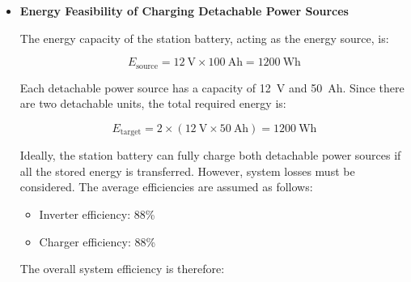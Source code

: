 {\begin{itemize}
 \begin{equation}
 	E_{\text{battery}} = V \times Ah = 12~\text{V} \times 100~\text{Ah} = 1200~\text{Wh}
 \end{equation}
 
 The system uses a 410~W solar panel as the charging source. The theoretical charging time, assuming ideal conditions and no system losses, is given by:
 
 \begin{equation}
 	t_{\text{charge}} = \frac{E_{\text{battery}}}{P_{\text{solar}}}
 	= \frac{1200~\text{Wh}}{410~\text{W}}
 	\approx 2.93~\text{hours}
 \end{equation}
 
 This value represents the ideal charging time. In real-world operation, charging will take longer due to inefficiencies in the system and variations in solar irradiance. Considering the average peak sun hours in the Philippines, which ranges from 4.5 to 5.5 hours per day, a practical charging duration of approximately 3-4 hours under peak sunlight is reasonable.
 
 	\item\textbf{Energy Feasibility of Charging Detachable Power Sources} 
 
 The energy capacity of the station battery, acting as the energy source, is:
 
 \begin{equation}
 	E_{\text{source}} = 12~\text{V} \times 100~\text{Ah} = 1200~\text{Wh}
 \end{equation}
 
 Each detachable power source has a capacity of 12~V and 50~Ah. Since there are two detachable units, the total required energy is:
 
 \begin{equation}
 	E_{\text{target}} = 2 \times (12~\text{V} \times 50~\text{Ah}) = 1200~\text{Wh}
 \end{equation}
 
 Ideally, the station battery can fully charge both detachable power sources if all the stored energy is transferred. However, system losses must be considered. The average efficiencies are assumed as follows:
 \begin{itemize}
 	\item Inverter efficiency: 88\%
 	\item Charger efficiency: 88\%
 \end{itemize}
 
 The overall system efficiency is therefore:
 

\end{itemize}}

